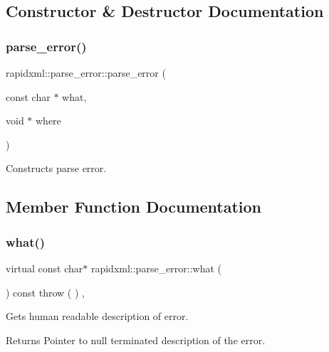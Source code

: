 \subsection{Constructor \& Destructor Documentation}
\mbox{\label{classrapidxml_1_1parse__error_aea12a301271c393fb627b368fb9f35c1}} 
\subsubsection{\texorpdfstring{parse\_error()}{parse\_error()}}
{\footnotesize\ttfamily rapidxml\+::parse\+\_\+error\+::parse\+\_\+error (\begin{DoxyParamCaption}\item[{const char $\ast$}]{what,  }\item[{void $\ast$}]{where }\end{DoxyParamCaption})\hspace{0.3cm}{\ttfamily [inline]}}



Constructs parse error. 



\subsection{Member Function Documentation}
\mbox{\label{classrapidxml_1_1parse__error_a986003116ebcb49a69a20228da306232}} 
\subsubsection{\texorpdfstring{what()}{what()}}
{\footnotesize\ttfamily virtual const char$\ast$ rapidxml\+::parse\+\_\+error\+::what (\begin{DoxyParamCaption}{ }\end{DoxyParamCaption}) const throw ( ) \hspace{0.3cm}{\ttfamily [inline]}, {\ttfamily [virtual]}}

Gets human readable description of error. \begin{DoxyReturn}{Returns}
Pointer to null terminated description of the error. 
\end{DoxyReturn}
\mbox{\label{classrapidxml_1_1parse__error_ab139528f4d9e960f0ee807d22d6c032d}} 
